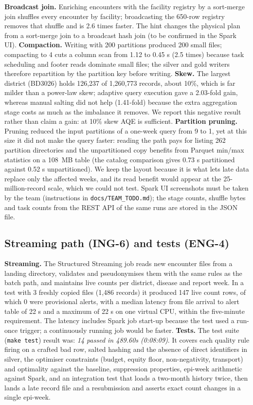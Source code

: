 \documentclass[conference]{IEEEtran}
\begin{document}
\textbf{Broadcast join.} Enriching encounters with the facility registry by a sort-merge join shuffles every encounter by facility; broadcasting the 650-row registry removes that shuffle and is 2.6 times faster. The hint changes the physical plan from a sort-merge join to a broadcast hash join (to be confirmed in the Spark UI). \textbf{Compaction.} Writing with 200 partitions produced 200 small files; compacting to 4 cuts a column scan from 1.12 to 0.45 s (2.5 times) because task scheduling and footer reads dominate small files; the silver and gold writers therefore repartition by the partition key before writing. \textbf{Skew.} The largest district (BD3026) holds 126,237 of 1,260,773 records, about 10\%, which is far milder than a power-law skew; adaptive query execution gave a 2.03-fold gain, whereas manual salting did not help (1.41-fold) because the extra aggregation stage costs as much as the imbalance it removes. We report this negative result rather than claim a gain: at 10\% skew AQE is sufficient. \textbf{Partition pruning.} Pruning reduced the input partitions of a one-week query from 9 to 1, yet at this size it did not make the query faster: reading the path pays for listing 262 partition directories and the unpartitioned copy benefits from Parquet min/max statistics on a 108~MB table (the catalog comparison gives 0.73 s partitioned against 0.52 s unpartitioned). We keep the layout because it is what lets late data replace only the affected weeks, and its read benefit would appear at the 25-million-record scale, which we could not test. Spark UI screenshots must be taken by the team (instructions in \texttt{docs/TEAM\_TODO.md}); the stage counts, shuffle bytes and task counts from the REST API of the same runs are stored in the JSON file.

\subsection{Streaming path (ING-6) and tests (ENG-4)}
\textbf{Streaming.} The Structured Streaming job reads new encounter files from a landing directory, validates and pseudonymises them with the same rules as the batch path, and maintains live counts per district, disease and report week. In a test with 3 freshly copied files (1,486 records) it produced 147 live count rows, of which 0 were provisional alerts, with a median latency from file arrival to alert table of 22 s and a maximum of 22 s on one virtual CPU, within the five-minute requirement. The latency includes Spark job start-up because the test used a run-once trigger; a continuously running job would be faster.
\textbf{Tests.} The test suite (\texttt{make test}) result was: \emph{14 passed in 489.60s (0:08:09)}. It covers each quality rule firing on a crafted bad row, salted hashing and the absence of direct identifiers in silver, the optimiser constraints (budget, equity floor, non-negativity, transport) and optimality against the baseline, suppression properties, epi-week arithmetic against Spark, and an integration test that loads a two-month history twice, then lands a late record file and a resubmission and asserts exact count changes in a single epi-week.
\end{document}

